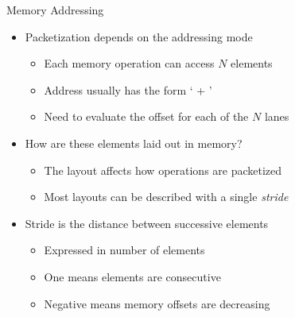 \begin{frame}{Memory Addressing}

\begin{minipage}[t]{0.60\linewidth}\begin{itemize}
    \item Packetization depends on the addressing mode
    \begin{itemize}
        \item Each memory operation can access $N$ elements
        \item Address usually has the form ` + '
        \item Need to evaluate the offset for each of the $N$ lanes
    \end{itemize}
    
    \item How are these elements laid out in memory?
    \begin{itemize}
        \item The layout affects how operations are packetized
        \item Most layouts can be described with a single \emph{stride}
    \end{itemize}
    
    \item Stride is the distance between successive elements
    \begin{itemize}
        \item Expressed in number of elements
        \item One means elements are consecutive
        \item Negative means memory offsets are decreasing
    \end{itemize}
    
\end{itemize}


\end{minipage}
\end{frame}
